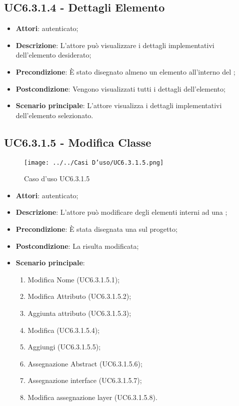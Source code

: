 \subsection{UC6.3.1.4 - Dettagli Elemento}
\label{ssec:UC6.3.1.4}
\begin{itemize}
\item \textbf{Attori}:  autenticato;
\item \textbf{Descrizione}: L'attore può visualizzare i dettagli implementativi dell'elemento desiderato;
\item \textbf{Precondizione}: È stato disegnato almeno un elemento all'interno del ;
\item \textbf{Postcondizione}: Vengono visualizzati tutti i dettagli dell'elemento;
\item \textbf{Scenario principale}: L'attore visualizza i dettagli implementativi dell'elemento selezionato.
\end{itemize}
\newpage
\subsection{UC6.3.1.5 - Modifica Classe}
\label{ssec:UC6.3.1.5}
\begin{figure}[h!]
\centering
\texttt{[image: ../../Casi D'uso/UC6.3.1.5.png]}
\caption{Caso d'uso UC6.3.1.5}
 \end{figure}
\begin{itemize}
\item \textbf{Attori}:  autenticato;
\item \textbf{Descrizione}: L'attore può modificare degli elementi interni ad una ;
\item \textbf{Precondizione}: È stata disegnata una  sul progetto;
\item \textbf{Postcondizione}: La  risulta modificata;
\item \textbf{Scenario principale}: \begin{enumerate}\item Modifica Nome (UC6.3.1.5.1);\item Modifica Attributo (UC6.3.1.5.2);\item Aggiunta attributo (UC6.3.1.5.3);\item Modifica  (UC6.3.1.5.4);\item Aggiungi  (UC6.3.1.5.5);\item Assegnazione Abstract (UC6.3.1.5.6);\item Assegnazione interface (UC6.3.1.5.7);\item Modifica assegnazione layer (UC6.3.1.5.8).
 \end{enumerate}
\end{itemize}
